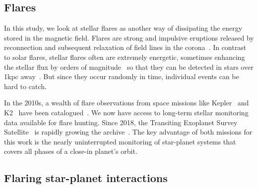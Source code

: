\documentclass[twocolumn]{aastex631}
\begin{document}
\subsection{Flares}
\label{sec:intro:flares}
In this study, we look at stellar flares as another way of dissipating the energy stored in the magnetic field. Flares are strong and impulsive eruptions released by reconnection and subsequent relaxation of field lines in the corona~\citep{svestka1976solar,priest2002magnetic}. In contrast to solar flares, stellar flares often are extremely energetic, sometimes enhancing the stellar flux by orders of magnitude~\citep{maehara2012superflares, shibayama2013superflares, paudel2018k2} so that they can be detected in stars over 1kpc away~\citep{chang2015photometric}. But since they occur randomly in time, individual events can be hard to catch. %

In the 2010s, a wealth of flare observations from space missions like Kepler~\citep{borucki2010kepler} and K2~\citep{howell2014k2} have been catalogued~\citep{davenport2016kepler, paudel2018k2, ilin2021flares}. We now have access to long-term stellar monitoring data available for flare hunting. Since 2018, the Transiting Exoplanet Survey Satellite~\citep{ricker2015transiting} is rapidly growing the archive~\citep{gunther2020stellar}. The key advantage of both missions for this work is the nearly uninterrupted monitoring of star-planet systems that covers all phases of a close-in planet's orbit.

\subsection{Flaring star-planet interactions}
\label{sec:intro:fspi}
\end{document}
